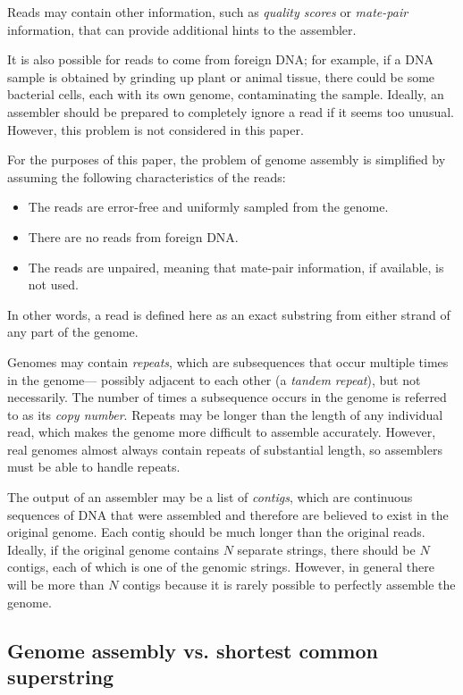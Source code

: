 \documentclass[10pt]{article}
\newcommand{\KeyTerm}[1]{{\it #1}}
\begin{document}
Reads may contain other information, such as \KeyTerm{quality scores} or
\KeyTerm{mate-pair} information, that can provide additional hints to the
assembler.

It is also possible for reads to come from foreign DNA; for example, if a DNA
sample is obtained by grinding up plant or animal tissue, there could be some
bacterial cells, each with its own genome, contaminating the sample.  Ideally,
an assembler should be prepared to completely ignore a read if it seems too
unusual.  However, this problem is not considered in this paper.

For the purposes of this paper, the problem of genome assembly is simplified by
assuming the following characteristics of the reads:

\begin{itemize}
	\item The reads are error-free and uniformly sampled from the genome.
	\item There are no reads from foreign DNA.
	\item The reads are unpaired, meaning that mate-pair information, if
available, is not used.
\end{itemize}

In other words, a read is defined here as an exact substring from either strand
of any part of the genome.

Genomes may contain \KeyTerm{repeats}, which are subsequences that occur
multiple times in the genome--- possibly adjacent to each other (a
\KeyTerm{tandem repeat}), but not necessarily.  The number of times a
subsequence occurs in the genome is referred to as its \KeyTerm{copy number}.
Repeats may be longer than the length of any individual read, which makes the
genome more difficult to assemble accurately.  However, real genomes almost
always contain repeats of substantial length, so assemblers must be able to
handle repeats.

The output of an assembler may be a list of \KeyTerm{contigs}, which are
continuous sequences of DNA that were assembled and therefore are believed to
exist in the original genome.  Each contig should be much longer than the
original reads.  Ideally, if the original genome contains $N$ separate strings,
there should be $N$ contigs, each of which is one of the genomic strings.
However, in general there will be more than $N$ contigs because it is rarely
possible to perfectly assemble the genome.

\subsection{Genome assembly vs. shortest common superstring}
\end{document}
